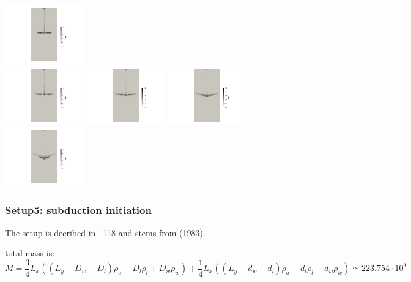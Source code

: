\begin{center}
\includegraphics[width=3.4cm]{python_codes/fieldstone_67/dripping/converted_0019.jpg}\\
\includegraphics[width=3.4cm]{python_codes/fieldstone_67/dripping/converted_0020.jpg}
\includegraphics[width=3.4cm]{python_codes/fieldstone_67/dripping/converted_0021.jpg}
\includegraphics[width=3.4cm]{python_codes/fieldstone_67/dripping/converted_0022.jpg}
\includegraphics[width=3.4cm]{python_codes/fieldstone_67/dripping/converted_0023.jpg}
\end{center}



\newpage
\subsubsection*{Setup5: subduction initiation}

The setup is decribed in \stone~118 and stems from \textcite{mato83} (1983). 

total mass is:
\[
M=\frac34 L_x \left( (L_y-D_w-D_l) \rho_a + D_l \rho_l + D_w \rho_w \right)
+ \frac14 L_x \left( (L_y-d_w-d_l) \rho_a + d_l \rho_l + d_w \rho_w \right)
\simeq 223.754\cdot10^9 
\]


